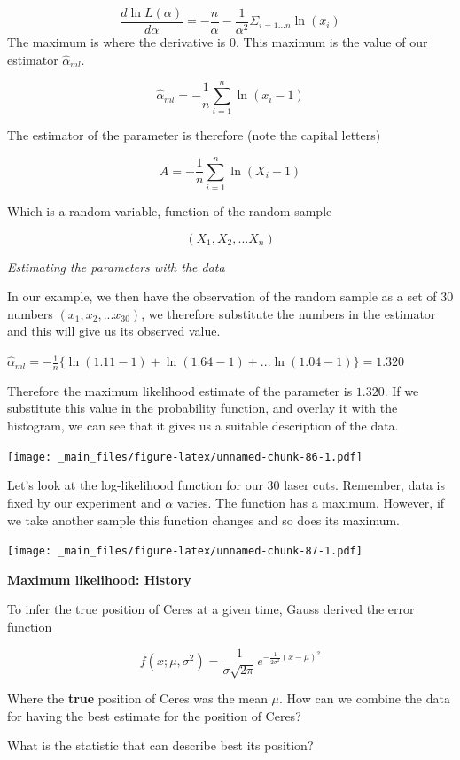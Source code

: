 \documentclass[
]{book}
\begin{document}
\[\frac{d \ln L(\alpha)}{d \alpha}= -\frac{n}{\alpha} - \frac{1}{\alpha^2}  \Sigma_{i=1...n} \ln (x_i)\]
The maximum is where the derivative is \(0\). This maximum is the value of our estimator \(\hat{\alpha}_{ml}\).

\[\hat{\alpha}_{ml}=-\frac{1}{n}\sum_{i=1}^n \ln (x_i-1)\]

The estimator of the parameter is therefore (note the capital letters)

\[A=-\frac{1}{n}\sum_{i=1}^n \ln (X_i-1)\]

Which is a random variable, function of the random sample

\[(X_1, X_2, ... X_n)\]

\emph{Estimating the parameters with the data}

In our example, we then have the observation of the random sample as a set of 30 numbers \((x_1, x_2, ...x_{30})\), we therefore substitute the numbers in the estimator and this will give us its observed value.

\(\hat{\alpha}_{ml}=-\frac{1}{n}\{ \ln (1.11-1)+ \ln (1.64-1)+...\ln (1.04-1)\}=1.320\)

Therefore the maximum likelihood estimate of the parameter is \(1.320\). If we substitute this value in the probability function, and overlay it with the histogram, we can see that it gives us a suitable description of the data.

\texttt{[image: \_main\_files/figure-latex/unnamed-chunk-86-1.pdf]}

Let's look at the log-likelihood function for our \(30\) laser cuts. Remember, data is fixed by our experiment and \(\alpha\) varies. The function has a maximum. However, if we take another sample this function changes and so does its maximum.

\texttt{[image: \_main\_files/figure-latex/unnamed-chunk-87-1.pdf]}

\textbf{Maximum likelihood: History}

To infer the true position of Ceres at a given time, Gauss derived the error function

\[f(x; \mu, \sigma^2)= \frac{1}{\sigma \sqrt{2 \pi}} e^{-\frac{1}{2\sigma^2} (x-\mu)^2}\]

Where the \textbf{true} position of Ceres was the mean \(\mu\). How can we combine the data for having the best estimate for the position of Ceres?

What is the statistic that can describe best its position?
\end{document}
